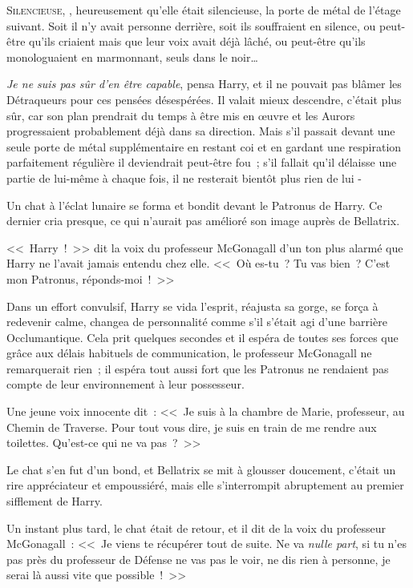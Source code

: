 
\lettrine{S}{ilencieuse}, , heureusement qu'elle était silencieuse, la porte de métal de l'étage suivant. Soit il n'y avait personne derrière, soit ils souffraient en silence, ou peut-être qu'ils criaient mais que leur voix avait déjà lâché, ou peut-être qu'ils monologuaient en marmonnant, seuls dans le noir…

\emph{Je ne suis pas sûr d'en être capable}, pensa Harry, et il ne pouvait pas blâmer les Détraqueurs pour ces pensées désespérées. Il valait mieux descendre, c'était plus sûr, car son plan prendrait du temps à être mis en œuvre et les Aurors progressaient probablement déjà dans sa direction. Mais s'il passait devant une seule porte de métal supplémentaire en restant coi et en gardant une respiration parfaitement régulière il deviendrait peut-être fou~; s'il fallait qu'il délaisse une partie de lui-même à chaque fois, il ne resterait bientôt plus rien de lui -

Un chat à l'éclat lunaire se forma et bondit devant le Patronus de Harry. Ce dernier cria presque, ce qui n'aurait pas amélioré son image auprès de Bellatrix.

<<~Harry~!~>> dit la voix du professeur McGonagall d'un ton plus alarmé que Harry ne l'avait jamais entendu chez elle. <<~Où es-tu~? Tu vas bien~? C'est mon Patronus, réponds-moi~!~>>

Dans un effort convulsif, Harry se vida l'esprit, réajusta sa gorge, se força à redevenir calme, changea de personnalité comme s'il s'était agi d'une barrière Occlumantique. Cela prit quelques secondes et il espéra de toutes ses forces que grâce aux délais habituels de communication, le professeur McGonagall ne remarquerait rien~; il espéra tout aussi fort que les Patronus ne rendaient pas compte de leur environnement à leur possesseur.

Une jeune voix innocente dit~: <<~Je suis à la chambre de Marie, professeur, au Chemin de Traverse. Pour tout vous dire, je suis en train de me rendre aux toilettes. Qu'est-ce qui ne va pas~?~>>

Le chat s'en fut d'un bond, et Bellatrix se mit à glousser doucement, c'était un rire appréciateur et empoussiéré, mais elle s'interrompit abruptement au premier sifflement de Harry.

Un instant plus tard, le chat était de retour, et il dit de la voix du professeur McGonagall~: <<~Je viens te récupérer tout de suite. Ne va \emph{nulle part}, si tu n'es pas près du professeur de Défense ne vas pas le voir, ne dis rien à personne, je serai là aussi vite que possible~!~>>


